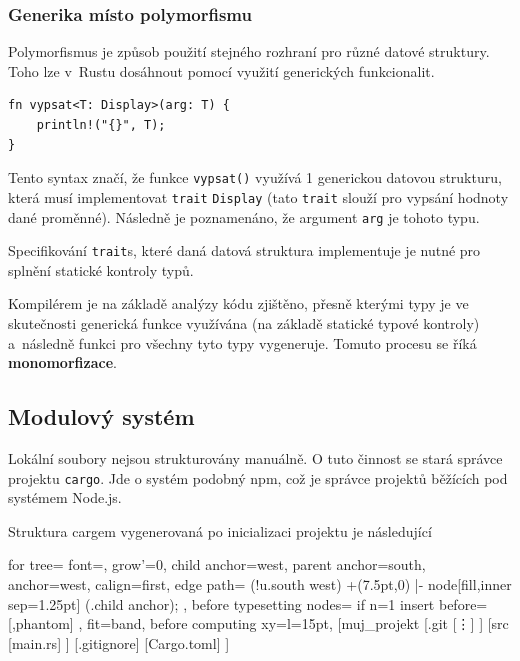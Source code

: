 \documentclass[a4paper, 12pt, twoside]{article} %
\begin{document}
		\subsubsection{Generika místo polymorfismu}
			Polymorfismus je způsob použití stejného rozhraní pro různé datové struktury. Toho lze v~Rustu dosáhnout pomocí využití generických funkcionalit.
			\begin{verbatim}
fn vypsat<T: Display>(arg: T) {
	println!("{}", T);
}
			\end{verbatim}
			
			Tento syntax značí, že funkce \texttt{vypsat()} využívá 1 generickou datovou strukturu, která musí implementovat \texttt{trait} \texttt{Display} (tato \texttt{trait} slouží pro vypsání hodnoty dané proměnné). Následně je poznamenáno, že argument \texttt{arg} je tohoto typu.
			
			Specifikování \texttt{trait}s, které daná datová struktura implementuje je nutné pro splnění statické kontroly typů.
			
			Kompilérem je na základě analýzy kódu zjištěno, přesně kterými typy je ve skutečnosti generická funkce využívána (na základě statické typové kontroly) a~následně funkci pro všechny tyto typy vygeneruje. Tomuto procesu se říká \textbf{monomorfizace}.

	\subsection{Modulový systém}
		Lokální soubory nejsou strukturovány manuálně. O tuto činnost se stará správce projektu \texttt{cargo}. Jde o systém podobný npm, což je správce projektů běžících pod systémem Node.js.
		
		Struktura cargem vygenerovaná po inicializaci projektu je následující
		\begin{center}
			\begin{forest}
				for tree={
				font=\ttfamily,
				grow'=0,
				child anchor=west,
				parent anchor=south,
				anchor=west,
				calign=first,
				edge path={
					\noexpand{}
					(!u.south west) +(7.5pt,0) |- node[fill,inner sep=1.25pt] {} (.child anchor);
				},
				before typesetting nodes={
					if n=1
					{insert before={[,phantom]}}
					{}
				},
				fit=band,
				before computing xy={l=15pt},
				}
			[muj\_projekt
				[.git
					[\vdots]
				]
				[src
					[main.rs]
				]
				[.gitignore]
				[Cargo.toml]
			]
			\end{forest}
		\end{center}
		
\end{document}

